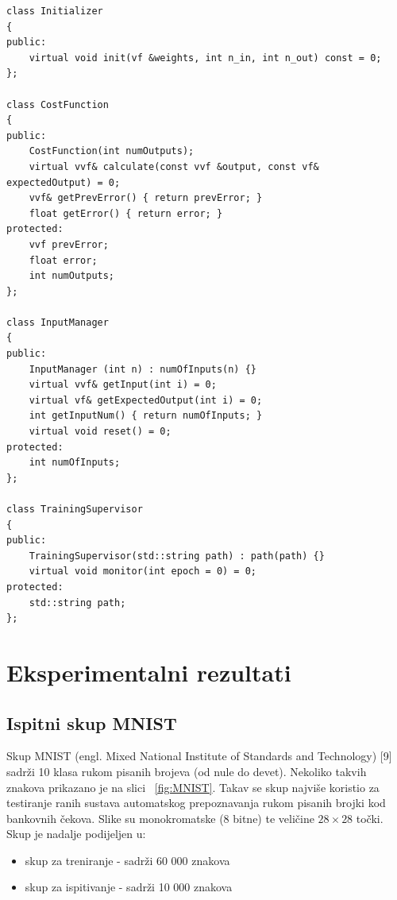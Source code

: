 \documentclass[times, utf8, zavrsni]{fer}
\begin{document}
\begin{lstlisting}[caption=Pomoćni razredi,
  label=util]
class Initializer
{
public:
    virtual void init(vf &weights, int n_in, int n_out) const = 0;
};

class CostFunction
{
public:
    CostFunction(int numOutputs);
    virtual vvf& calculate(const vvf &output, const vf& expectedOutput) = 0;
    vvf& getPrevError() { return prevError; }
    float getError() { return error; }
protected:
    vvf prevError;
    float error;
    int numOutputs;
};

class InputManager
{
public:
    InputManager (int n) : numOfInputs(n) {}
    virtual vvf& getInput(int i) = 0;
    virtual vf& getExpectedOutput(int i) = 0;
    int getInputNum() { return numOfInputs; }
    virtual void reset() = 0;
protected:
    int numOfInputs;
};

class TrainingSupervisor
{
public:
    TrainingSupervisor(std::string path) : path(path) {}
    virtual void monitor(int epoch = 0) = 0;
protected:
    std::string path;
};
\end{lstlisting}

\chapter{Eksperimentalni rezultati}

\section{Ispitni skup MNIST}
Skup MNIST (engl. Mixed National Institute of Standards and Technology) [9] sadrži
10 klasa rukom pisanih brojeva (od nule do devet). Nekoliko takvih znakova prikazano
je na slici ~\ref{fig:MNIST}. Takav se skup najviše koristio za testiranje ranih sustava automatskog
prepoznavanja rukom pisanih brojki kod bankovnih čekova. Slike su monokromatske
(8 bitne) te veličine $28 \times 28$ točki. Skup je nadalje podijeljen u:
\begin{itemize}
\item skup za treniranje - sadrži 60 000 znakova
\item skup za ispitivanje - sadrži 10 000 znakova
\end{itemize}
\end{document}
